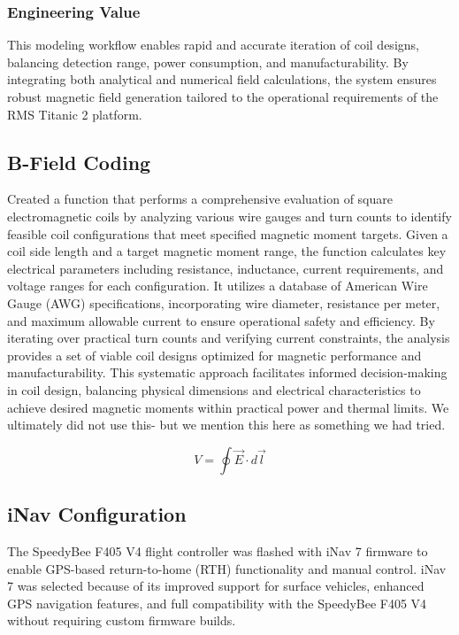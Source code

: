 \subsubsection{Engineering Value}
This modeling workflow enables rapid and accurate iteration of coil designs, balancing detection range, power consumption, and manufacturability. By integrating both analytical and numerical field calculations, the system ensures robust magnetic field generation tailored to the operational requirements of the RMS Titanic 2 platform.

\subsection{B-Field Coding}
Created a function that performs a comprehensive evaluation of square electromagnetic coils by analyzing various wire gauges and turn counts to identify feasible coil configurations that meet specified magnetic moment targets. Given a coil side length and a target magnetic moment range, the function calculates key electrical parameters including resistance, inductance, current requirements, and voltage ranges for each configuration. It utilizes a database of American Wire Gauge (AWG) specifications, incorporating wire diameter, resistance per meter, and maximum allowable current to ensure operational safety and efficiency. By iterating over practical turn counts and verifying current constraints, the analysis provides a set of viable coil designs optimized for magnetic performance and manufacturability. This systematic approach facilitates informed decision-making in coil design, balancing physical dimensions and electrical characteristics to achieve desired magnetic moments within practical power and thermal limits. We ultimately did not use this- but we mention this here as something we had tried.

\begin{equation}
V=\oint \overrightarrow{E}\cdot d\overrightarrow{l}  
\label{MyEquation}
\end{equation}

\subsection{iNav Configuration}

The SpeedyBee F405 V4 flight controller was flashed with iNav 7 firmware to enable GPS-based return-to-home (RTH) functionality and manual control. iNav 7 was selected because of its improved support for surface vehicles, enhanced GPS navigation features, and full compatibility with the SpeedyBee F405 V4 without requiring custom firmware builds.

